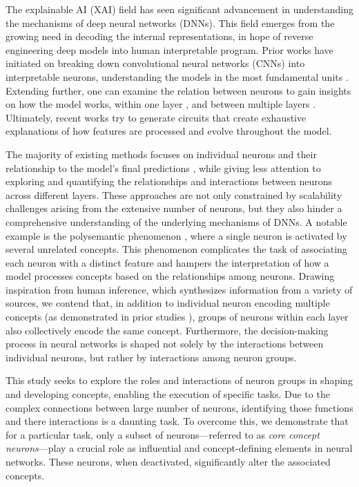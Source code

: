 The explainable AI (XAI) field has seen significant advancement in understanding the mechanisms of deep neural networks (DNNs). This field emerges from the growing need in decoding the internal representations, in hope of reverse engineering deep models into human interpretable program. Prior works have initiated on breaking down convolutional neural networks (CNNs) into interpretable neurons, understanding the models in the most fundamental units \citep{Multifaceted, Deconv, Polysemantic, Invert}. Extending further, one can examine the relation between neurons to gain insights on how the model works, within one layer \citep{NEUCEPT}, and between multiple layers \citep{Olah}. Ultimately, recent works try to generate circuits \citep{Olah, Invert, GPT2circuit, ACDC} that create exhaustive explanations of how features are processed and evolve throughout the model.

The majority of existing methods focuses on individual neurons \cite{oikarinen2024linear, NEURIPS2023_debd0ae2} and their relationship to the model's final predictions \cite{ghorbani2020neuron, wang2022hint, NEURIPS2020_41c542df}, while giving less attention to exploring and quantifying the relationships and interactions between neurons across different layers.
These approaches are not only constrained by scalability challenges arising from the extensive number of neurons, but they also hinder a comprehensive understanding of the underlying mechanisms of DNNs. 
A notable example is the polysemantic phenomenon \cite{mu2020compositional, Polysemantic, olah2020zoom}, where a single neuron is activated by several unrelated concepts.
This phenomenon complicates the task of associating each neuron with a distinct feature and hampers the interpretation of how a model processes concepts based on the relationships among neurons.
Drawing inspiration from human inference, which synthesizes information from a variety of sources, we contend that, in addition to individual neuron encoding multiple concepts (as demonstrated in prior studies \cite{Polysemantic, olah2020zoom}), groups of neurons within each layer also collectively encode the same concept. Furthermore, the decision-making process in neural networks is shaped not solely by the interactions between individual neurons, but rather by interactions among neuron groups.

This study seeks to explore the roles and interactions of neuron groups in shaping and developing concepts, enabling the execution of specific tasks.
Due to the complex connections between large number of neurons, identifying those functions and there interactions is a daunting task. 
To overcome this, we demonstrate that for a particular task, only a subset of neurons—referred to as \textit{core concept neurons}—play a crucial role as influential and concept-defining elements in neural networks. These neurons, when deactivated, significantly alter the associated concepts.
 
